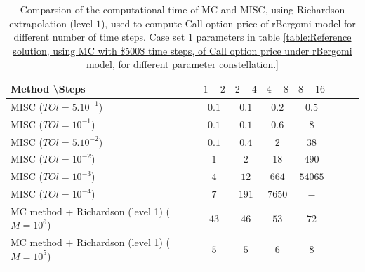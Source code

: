 \documentclass[11pt]{article}
\begin{document}
\begin{table}[!h]
	\centering
	\begin{tabular}{l*{6}{c}r}
		Method \textbackslash  Steps            & $1-2$ & $2-4$ & $4-8$ & $8-16$ &   \\
		\hline
		MISC ($TOl=5.10^{-1}$)  & $0.1$ & $0.1$ & $0.2$ & $0.5$  \\
		MISC ($TOl=10^{-1}$)  & $0.1$ & $0.1$ & $0.6$ & $8$  \\
		MISC ($TOl=5.10^{-2}$)  & $0.1$ & $0.4$ & $2$ & $38$  \\
		MISC ($TOl=10^{-2}$)  & $1$ & $2$ & $18$ & $490$  \\
		MISC ($TOl=10^{-3}$)  & $4$ & $12$ & $664$ & $54065$  \\	
		MISC ($TOl=10^{-4}$)  & $7$ & $191$ & $7650$ & $-$  \\
		\hline
		MC method + Richardson (level 1) ($M=10^{6}$)  &$43$ & $46$  & $53$  & $72$ \\	
		MC method + Richardson (level 1) ($M=10^{5}$)  &$5$ & $5$  & $6$  & $8$ \\	
		\hline
	\end{tabular}
	\caption{Comparsion of the computational time of  MC and MISC, using Richardson extrapolation (level $1$), used to compute Call option price of rBergomi model for different number of time steps. Case set $1$ parameters in table \ref{table:Reference solution, using MC with $500$ time steps, of Call option price under rBergomi model, for different parameter constellation.}}
	\label{Comparsion of the computational time of  MC and MISC, using Richardson extrapolation (level $1$), used to compute Call option price of rBergomi model for different number of time steps. Case set $1$ parameters}
\end{table}

\FloatBarrier
\end{document}
